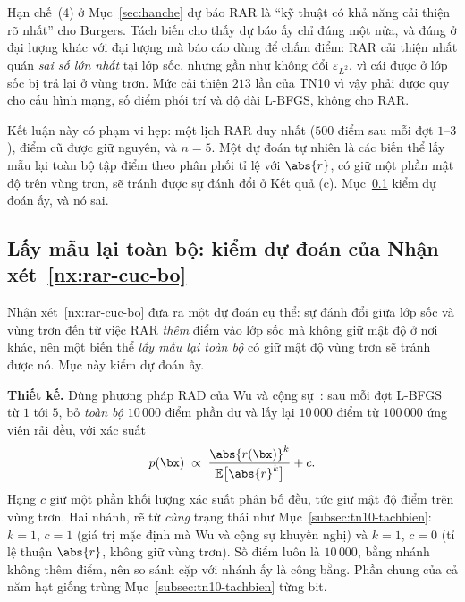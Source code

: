 \begin{nhanxet}
\label{nx:rar-cuc-bo}
Hạn chế~(4) ở Mục~\ref{sec:hanche} dự báo RAR là ``kỹ thuật có khả năng cải
thiện rõ nhất'' cho Burgers. Tách biến cho thấy dự báo ấy chỉ đúng một nửa, và
đúng ở đại lượng khác với đại lượng mà báo cáo dùng để chấm điểm: RAR cải thiện
nhất quán \emph{sai số lớn nhất} tại lớp sốc, nhưng gần như không đổi
$\varepsilon_{L^2}$, vì cái được ở lớp sốc bị trả lại ở vùng trơn. Mức cải
thiện $213$ lần của TN10 vì vậy phải được quy cho cấu hình mạng, số điểm phối trí
và độ dài L-BFGS, không cho RAR.

Kết luận này có phạm vi hẹp: một lịch RAR duy nhất ($500$ điểm sau mỗi đợt
$1$--$3$), điểm cũ được giữ nguyên, và $n = 5$. Một dự đoán tự nhiên là các biến
thể lấy mẫu lại toàn bộ tập điểm theo phân phối tỉ lệ với $\abs{r}$, có giữ một
phần mật độ trên vùng trơn, sẽ tránh được sự đánh đổi ở Kết quả (c).
Mục~\ref{subsec:tn10-rad} kiểm dự đoán ấy, và nó sai.
\end{nhanxet}

\subsection{Lấy mẫu lại toàn bộ: kiểm dự đoán của Nhận xét~\ref{nx:rar-cuc-bo}}
\label{subsec:tn10-rad}

Nhận xét~\ref{nx:rar-cuc-bo} đưa ra một dự đoán cụ thể: sự đánh đổi giữa lớp
sốc và vùng trơn đến từ việc RAR \emph{thêm} điểm vào lớp sốc mà không giữ mật
độ ở nơi khác, nên một biến thể \emph{lấy mẫu lại toàn bộ} có giữ mật độ vùng
trơn sẽ tránh được nó. Mục này kiểm dự đoán ấy.

\textbf{Thiết kế.} Dùng phương pháp RAD của Wu và cộng sự~\cite{wu2023}: sau mỗi
đợt L-BFGS từ $1$ tới $5$, bỏ \emph{toàn bộ} $10\,000$ điểm phần dư và lấy lại
$10\,000$ điểm từ $100\,000$ ứng viên rải đều, với xác suất
\begin{equation}
p(\bx) \;\propto\; \frac{\abs{r(\bx)}^{k}}{\mathbb{E}\big[\abs{r}^{k}\big]} + c .
\label{eq:rad}
\end{equation}
Hạng $c$ giữ một phần khối lượng xác suất phân bố đều, tức giữ mật độ điểm trên
vùng trơn. Hai nhánh, rẽ từ \emph{cùng} trạng thái như
Mục~\ref{subsec:tn10-tachbien}: $k = 1$, $c = 1$ (giá trị mặc định mà Wu và cộng
sự khuyến nghị) và $k = 1$, $c = 0$ (tỉ lệ thuận $\abs{r}$, không giữ vùng
trơn). Số điểm luôn là $10\,000$, bằng nhánh không thêm điểm, nên so sánh cặp
với nhánh ấy là công bằng. Phần chung của cả năm hạt giống trùng
Mục~\ref{subsec:tn10-tachbien} từng bit.

